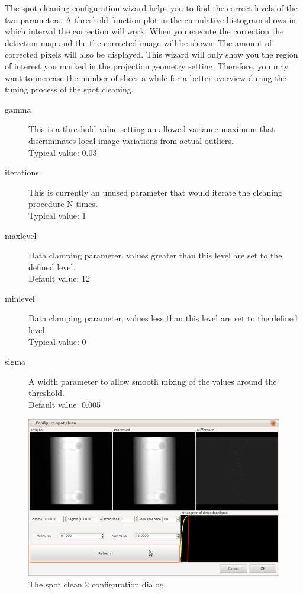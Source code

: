 \documentclass[a4paper]{scrreprt}
\begin{document}
The spot cleaning configuration wizard helps you to find the correct levels of the two parameters. A threshold function plot in the cumulative histogram shows in which interval the correction will work. When you execute the correction the
detection map and the the corrected image will be shown. The amount of corrected pixels will also be displayed. This wizard will only show you the region of interest you marked in the projection geometry setting. Therefore, you may want
to increase the number of slices a while for a better overview during the tuning process of the spot cleaning.
\begin{description}
 \item[gamma] This is a threshold value setting an allowed variance maximum that discriminates local image variations from actual outliers. \\
Typical value: 0.03
 \item[iterations] This is currently an unused parameter that would iterate the cleaning procedure N times.\\
Typical value: 1
 \item[maxlevel] Data clamping parameter, values greater than this level are set to the defined level.\\ Default value: 12
 \item[minlevel]Data clamping parameter, values less than this level are set to the defined level.\\ Typical value: 0
 \item[sigma] A width parameter to allow smooth mixing of the values around the threshold. \\ Default value: 0.005
\end{description}
\begin{figure}[ht!]
\centering
\includegraphics[scale=0.5]{figures/ConfSpotClean2.png}
\caption{The spot clean 2 configuration dialog.}
\end{figure}
\end{document}
